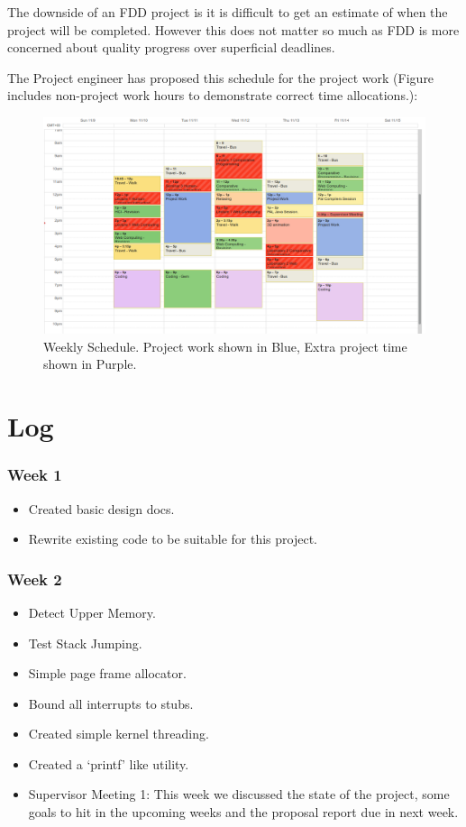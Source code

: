 \documentclass[a4paper]{report}
\begin{document}
The downside of an FDD project is it is difficult to get an estimate of when the project will be completed. However this does not matter so much as FDD is more concerned about quality progress over superficial deadlines.

The Project engineer has proposed this schedule for the project work (Figure includes non-project work hours to demonstrate correct time allocations.):


\begin{figure}[ht]
\centering
\includegraphics[width=450px]{images/schedule_screenshot}
\caption{Weekly Schedule. Project work shown in Blue, Extra project time shown in Purple.}
\label{fig:schedulerscreen}
\end{figure}


\chapter*{Log}


\subsection*{Week 1}
\begin{itemize}
\item Created basic design docs.
\item Rewrite existing code to be suitable for this project.
\end{itemize}

\subsection*{Week 2}
\begin{itemize}
\item Detect Upper Memory.
\item Test Stack Jumping.
\item Simple page frame allocator.
\item Bound all interrupts to stubs.
\item Created simple kernel threading.
\item Created a `printf' like utility.
\item Supervisor Meeting 1: This week we discussed the state of the project, some goals to hit in the upcoming weeks and the proposal report due in next week.
\end{itemize}
\end{document}
